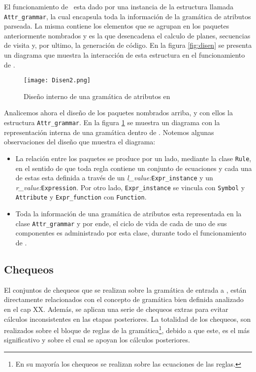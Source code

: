 El funcionamiento de \maggen\ esta dado por una instancia de la estructura llamada \texttt{Attr\_grammar}, la cual encapsula toda la información de la gramática de atributos parseada. La misma contiene los elementos que se agrupan en los paquetes anteriormente nombrados y es la que desencadena el calculo de planes, secuencias de visita y, por ultimo, la generación de código.  
En la figura \ref{fig:disen} se presenta un diagrama que muestra la interacción de esta estructura en el funcionamiento de \maggen.


\begin{figure}\centering
\texttt{[image: Disen2.png]}
\caption{\label{fig:disen2}Diseño interno de una gramática de atributos en \maggen}
\end{figure}
Analicemos ahora el diseño de los paquetes nombrados arriba, y con ellos la estructura \texttt{Attr\_grammar}.  En la figura \ref{fig:disen2} se muestra un diagrama con la representación interna de una gramática dentro de \maggen. Notemos algunas observaciones del diseño que muestra el diagrama:
\begin{itemize}
\item La relación entre los paquetes se produce por un lado, mediante la clase \texttt{Rule}, en el sentido de que toda regla contiene un conjunto de ecuaciones y cada una de estas esta definida a través de un \textit{l\_value:}\texttt{Expr\_instance} y un \textit{r\_value:}\texttt{Expression}. Por otro lado, \texttt{Expr\_instance} se vincula con \texttt{Symbol} y \texttt{Attribute} y \texttt{Expr\_function} con \texttt{Function}.

\item Toda la información de una gramática de atributos esta representada en la clase \texttt{Attr\_grammar} y por ende, el ciclo de vida de cada de uno de sus componentes es administrado por esta clase, durante todo el funcionamiento de \maggen. 
\end{itemize}



\subsection*{Chequeos}

El conjuntos de chequeos que se realizan sobre la gramática de entrada a \maggen, están directamente relacionados con el concepto de gramática bien definida analizado en el cap XX. Además, se aplican una serie de chequeos extras para evitar cálculos inconsistentes en las etapas posteriores. La totalidad de los chequeos, son realizados sobre el bloque de reglas de la gramática\footnote{En su mayoría los chequeos se realizan sobre las ecuaciones de las reglas.}, debido a que este, es el más significativo y sobre el cual se apoyan los cálculos posteriores.

